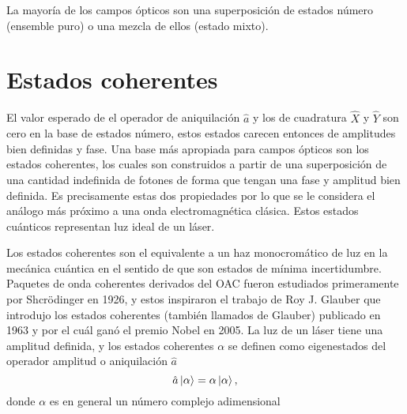 La mayoría de los campos ópticos son una superposición de estados número (ensemble puro) o una mezcla de ellos (estado mixto).
\iffalse
  donde se considera la aportación de la energía del vacío. Usando la relación de conmutación de $\hat{a}$ y $\hat{a}^{\dagger}$ sobre el estado vacío $(\hat{a}\hat{a}^{\dagger}-\hat{a}^{\dagger}\hat{a})\ket{0} = \hat{a}\hat{a}^{\dagger}\ket{0} = \ket{0}$ implica que $\hat{a}^{\dagger}\hat{a}(\hat{a}^{\dagger}\ket{0}) = \hat{a}^{\dagger}\ket{0}$, por lo que $\hat{a}^{\dagger}\ket{0}$ es un eigenestado de $\hat{a}^{\dagger}\hat{a}$ con valor propio 1, a este estado se le denomina estado de un fotón y se denota como $\ket{1} = \hat{a}^{\dagger}\ket{0}$. De forma análoga, se puede obtener el n-ésimo estado de $n$ fotones $\ket{n}$ de forma inductiva, lo que resulta en
  \begin{equation}
    \ket{n} = \frac{\hat{a}^{\dagger\,n}}{\sqrt{n!}}\ket{0}
  \end{equation}
\fi
\section{Estados coherentes}
El valor esperado de el operador de aniquilación $\hat{a}$ y los de cuadratura $\hat{X}$ y $\hat{Y}$ son cero en la base de estados número, estos estados carecen entonces de amplitudes bien definidas y fase. Una base más apropiada para campos ópticos son los estados coherentes, los cuales son construidos a partir de una superposición de una cantidad indefinida de fotones de forma que tengan una fase y amplitud bien definida. Es precisamente estas dos propiedades por lo que se le considera el análogo más próximo a una onda electromagnética clásica. Estos estados cuánticos representan luz ideal de un láser.

Los estados coherentes son el equivalente a un haz monocromático de luz en la mecánica cuántica en el sentido de que son estados de mínima incertidumbre.  Paquetes de onda coherentes derivados del OAC fueron estudiados primeramente por Shcrödinger en 1926, y estos inspiraron el trabajo de Roy J. Glauber \cite{Glauber} que introdujo los estados coherentes (también llamados de Glauber) publicado en 1963 y por el cuál ganó el premio Nobel en 2005. La luz de un láser tiene una amplitud definida, y los estados coherentes $\alpha$ se definen como eigenestados del operador amplitud o aniquilación $\hat{a}$
\begin{equation}
  \hat{a} \ket{\alpha} = \alpha\ket{\alpha},
\end{equation}
donde $\alpha$ es en general un número complejo adimensional

